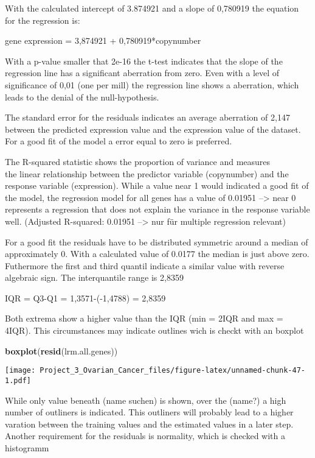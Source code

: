 \documentclass[]{article}
\newenvironment{Shaded}{\begin{snugshade}}{\end{snugshade}}
\newcommand{\KeywordTok}[1]{\textcolor[rgb]{0.13,0.29,0.53}{\textbf{#1}}}
\newcommand{\NormalTok}[1]{#1}
\begin{document}
With the calculated intercept of 3.874921 and a slope of 0,780919 the
equation for the regression is:

gene expression = 3,874921 + 0,780919*copynumber

With a p-value smaller that 2e-16 the t-test indicates that the slope of
the regression line has a significant aberration from zero. Even with a
level of significance of 0,01 (one per mill) the regression line shows a
aberration, which leads to the denial of the null-hypothesis.

The standard error for the residuals indicates an average aberration of
2,147 between the predicted expression value and the expression value of
the dataset. For a good fit of the model a error equal to zero is
preferred.

The R-squared statistic shows the proportion of variance and measures\\
the linear relationship between the predictor variable (copynumber) and
the response variable (expression). While a value near 1 would indicated
a good fit of the model, the regression model for all genes has a value
of 0.01951 --\textgreater{} near 0 represents a regression that does not
explain the variance in the response variable well. (Adjusted R-squared:
0.01951 --\textgreater{} nur für multiple regression relevant)

For a good fit the residuals have to be distributed symmetric around a
median of approximately 0. With a calculated value of 0.0177 the median
is just above zero. Futhermore the first and third quantil indicate a
similar value with reverse algebraic sign. The interquantile range is
2,8359

IQR = Q3-Q1 = 1,3571-(-1,4788) = 2,8359

Both extrema show a higher value than the IQR (min = 2IQR and max =
4IQR). This circumstances may indicate outlines wich is checkt with an
boxplot

\begin{Shaded}
\begin{Highlighting}[]
\KeywordTok{boxplot}\NormalTok{(}\KeywordTok{resid}\NormalTok{(lrm.all.genes))}
\end{Highlighting}
\end{Shaded}

\texttt{[image: Project\_3\_Ovarian\_Cancer\_files/figure-latex/unnamed-chunk-47-1.pdf]}

While only value beneath (name suchen) is shown, over the (name?) a high
number of outliners is indicated. This outliners will probably lead to a
higher varation between the training values and the estimated values in
a later step. Another requirement for the residuals is normality, which
is checked with a histogramm
\end{document}
